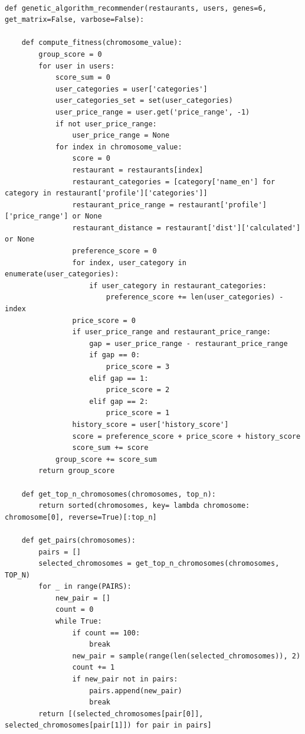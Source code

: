 \documentclass[12pt,oneside,openright,a4paper]{cpe-english-project}
\begin{document}
 \\

\begin{lstlisting}
def genetic_algorithm_recommender(restaurants, users, genes=6, get_matrix=False, varbose=False):

    def compute_fitness(chromosome_value):
        group_score = 0
        for user in users:
            score_sum = 0
            user_categories = user['categories']
            user_categories_set = set(user_categories)
            user_price_range = user.get('price_range', -1)
            if not user_price_range:
                user_price_range = None
            for index in chromosome_value:
                score = 0
                restaurant = restaurants[index]
                restaurant_categories = [category['name_en'] for category in restaurant['profile']['categories']]
                restaurant_price_range = restaurant['profile']['price_range'] or None
                restaurant_distance = restaurant['dist']['calculated'] or None
                preference_score = 0
                for index, user_category in enumerate(user_categories):
                    if user_category in restaurant_categories:
                        preference_score += len(user_categories) - index
                price_score = 0
                if user_price_range and restaurant_price_range:
                    gap = user_price_range - restaurant_price_range
                    if gap == 0:
                        price_score = 3
                    elif gap == 1:
                        price_score = 2
                    elif gap == 2:
                        price_score = 1
                history_score = user['history_score']
                score = preference_score + price_score + history_score
                score_sum += score
            group_score += score_sum
        return group_score

    def get_top_n_chromosomes(chromosomes, top_n):
        return sorted(chromosomes, key= lambda chromosome: chromosome[0], reverse=True)[:top_n]

    def get_pairs(chromosomes):
        pairs = []
        selected_chromosomes = get_top_n_chromosomes(chromosomes, TOP_N)
        for _ in range(PAIRS):
            new_pair = []
            count = 0
            while True:
                if count == 100:
                    break
                new_pair = sample(range(len(selected_chromosomes)), 2)
                count += 1
                if new_pair not in pairs:
                    pairs.append(new_pair)
                    break
        return [(selected_chromosomes[pair[0]], selected_chromosomes[pair[1]]) for pair in pairs]


\end{lstlisting}
\end{document}
